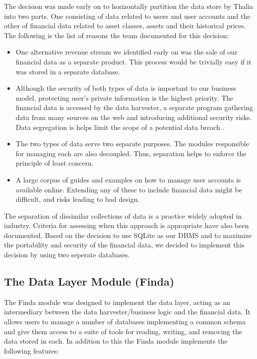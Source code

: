 \documentclass[main.tex]{subfiles}
\begin{document}
The decision was made early on to horizontally partition the data store by Thalia into two parts. One consisting of data related to users and user accounts and the other of financial data related to asset classes, assets and their historical prices. The following is the list of reasons the team documented for this decision:

\begin{itemize}

\item One alternative revenue stream we identified early on was the sale of our financial data as a separate product. This process would be trivially easy if it was stored in a separate database. 
\item Although the security of both types of data is important to our business model, protecting user’s private information is the highest priority. The financial data is accessed by the data harvester, a separate program gathering data from many sources on the web and introducing additional security risks. Data segregation is helps limit the scope of a potential data breach \cite{ciscoSeg}.
\item The two types of data serve two separate purposes. The modules responsible for managing each are also decoupled. Thus, separation helps to enforce the principle of least concern.
\item A large corpus of guides and examples on how to manage user accounts is available online. Extending any of these to include financial data might be difficult, and risks leading to bad design.
\end{itemize}

The separation of dissimilar collections of data is a practice widely adopted in industry. Criteria for assessing when this approach is appropriate have also been documented. \cite{dataSegImp} Based on the decision to use SQLite as our DBMS and to maximize the portability and security of the financial data, we decided to implement this decision by using two seperate databases.

\subsection{The Data Layer Module (Finda)}

The Finda module was designed to implement the data layer, acting as an intermediary between the data harvester/business logic and the financial data. It allows users to manage a number of databases implementing a common schema and give them access to a suite of tools for reading, writing, and removing the data stored in each. In addition to this the Finda module implements the following features:
\end{document}

